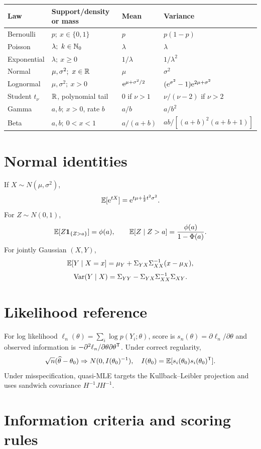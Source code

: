 \begin{longtable}{p{}p{}p{}p{}}
\toprule
Law & Support/density or mass & Mean & Variance\\
\midrule
Bernoulli & $p;\ x\in\{0,1\}$ & $p$ & $p(1-p)$\\
Poisson & $\lambda;\ k\in\N_0$ & $\lambda$ & $\lambda$\\
Exponential & $\lambda;\ x\geq0$ & $1/\lambda$ & $1/\lambda^2$\\
Normal & $\mu,\sigma^2;\ x\in\R$ & $\mu$ & $\sigma^2$\\
Lognormal & $\mu,\sigma^2;\ x>0$ & $\mathrm e^{\mu+\sigma^2/2}$ &
$(\mathrm e^{\sigma^2}-1)\mathrm e^{2\mu+\sigma^2}$\\
Student $t_\nu$ & $\mathbb R$, polynomial tail & $0$ if $\nu>1$ &
$\nu/(\nu-2)$ if $\nu>2$\\
Gamma & $a,b;\ x>0$, rate $b$ & $a/b$ & $a/b^2$\\
Beta & $a,b;\ 0<x<1$ & $a/(a+b)$ &
$ab/[(a+b)^2(a+b+1)]$\\
\bottomrule
\end{longtable}

\section{Normal identities}

If $X\sim N(\mu,\sigma^2)$,
\[
\operatorname{\mathbb E}[\mathrm e^{tX}]=\mathrm e^{t\mu+\frac12t^2\sigma^2}.
\]
For $Z\sim N(0,1)$,
\[
\operatorname{\mathbb E}[Z\mathbf 1_{\{Z>a\}}]=\phi(a),\qquad
\operatorname{\mathbb E}[Z\mid Z>a]=\frac{\phi(a)}{1-\Phi(a)}.
\]
For jointly Gaussian $(X,Y)$,
\[
\operatorname{\mathbb E}[Y\mid X=x]=
\mu_Y+\Sigma_{YX}\Sigma_{XX}^{-1}(x-\mu_X),
\]
\[
\operatorname{Var}(Y\mid X)=
\Sigma_{YY}-\Sigma_{YX}\Sigma_{XX}^{-1}\Sigma_{XY}.
\]

\section{Likelihood reference}

For log likelihood $\ell_n(\theta)=\sum_i\log p(Y_i;\theta)$, score is
$s_n(\theta)=\partial\ell_n/\partial\theta$ and observed information is
$-\partial^2\ell_n/\partial\theta\partial\theta^\mathsf T$. Under correct
regularity,
\[
\sqrt n(\widehat\theta-\theta_0)
\Rightarrow N(0,I(\theta_0)^{-1}),
\quad
I(\theta_0)=\operatorname{\mathbb E}[s_i(\theta_0)s_i(\theta_0)^\mathsf T].
\]
Under misspecification, quasi-MLE targets the Kullback--Leibler projection and uses
sandwich covariance $H^{-1}JH^{-1}$.

\section{Information criteria and scoring rules}

